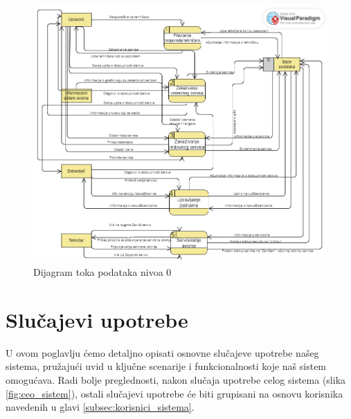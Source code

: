 \documentclass[a4paper]{article}
\begin{document}
\begin{figure}[H]
\begin{center}
\includegraphics[scale=0.7, width = 1.1\textwidth]{Dijagrami/Dijagrami_toka_podataka/DTP_nivo_0.png}
\end{center}
\caption{Dijagram toka podataka nivoa 0}
\label{fig:dtp_nivoa_0}
\end{figure}

\section{Slučajevi upotrebe}
\label{sec:sluvajevi_upotrebe}
U ovom poglavlju ćemo detaljno opisati osnovne slučajeve upotrebe našeg sistema, pružajući uvid u ključne scenarije i funkcionalnosti koje naš sistem omogućava. Radi bolje preglednosti, nakon slučaja upotrebe celog sistema (slika \ref{fig:ceo_sistem}), ostali slučajevi upotrebe će biti grupisani na osnovu korisnika navedenih u glavi \ref{subsec:korisnici_sistema}.
\end{document}
